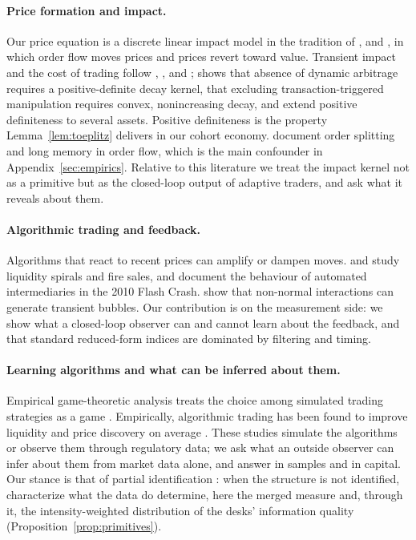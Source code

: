 \documentclass[12pt]{article}
\theoremstyle{definition}
\theoremstyle{remark}
\begin{document}
\paragraph{Price formation and impact.} Our price equation is a discrete linear impact model in the tradition of \citet{kyle1985}, \citet{glosten1985} and \citet{hasbrouck1991}, in which order flow moves prices and prices revert toward value. Transient impact and the cost of trading follow \citet{almgren2001}, \citet{obizhaeva2013}, \citet{gatheral2010} and \citet{bouchaud2004}; \citet{gatheral2010} shows that absence of dynamic arbitrage requires a positive-definite decay kernel, \citet{alfonsi2012} that excluding transaction-triggered manipulation requires convex, nonincreasing decay, and \citet{alfonsi2016} extend positive definiteness to several assets. Positive definiteness is the property Lemma~\ref{lem:toeplitz} delivers in our cohort economy. \citet{bouchaud2018} document order splitting and long memory in order flow, which is the main confounder in Appendix~\ref{sec:empirics}. Relative to this literature we treat the impact kernel not as a primitive but as the closed-loop output of adaptive traders, and ask what it reveals about them.

\paragraph{Algorithmic trading and feedback.} Algorithms that react to recent prices can amplify or dampen moves. \citet{brunnermeier2009} and \citet{shleifer1992} study liquidity spirals and fire sales, and \citet{kirilenko2017} document the behaviour of automated intermediaries in the 2010 Flash Crash. \citet{sornette2023} show that non-normal interactions can generate transient bubbles. Our contribution is on the measurement side: we show what a closed-loop observer can and cannot learn about the feedback, and that standard reduced-form indices are dominated by filtering and timing.

\paragraph{Learning algorithms and what can be inferred about them.} Empirical game-theoretic analysis treats the choice among simulated trading strategies as a game \citep{wellman2006}. Empirically, algorithmic trading has been found to improve liquidity and price discovery on average \citep{hendershott2011,brogaard2014}. These studies simulate the algorithms or observe them through regulatory data; we ask what an outside observer can infer about them from market data alone, and answer in samples and in capital. Our stance is that of partial identification \citep{manski2003}: when the structure is not identified, characterize what the data do determine, here the merged measure and, through it, the intensity-weighted distribution of the desks' information quality (Proposition~\ref{prop:primitives}).
\end{document}
